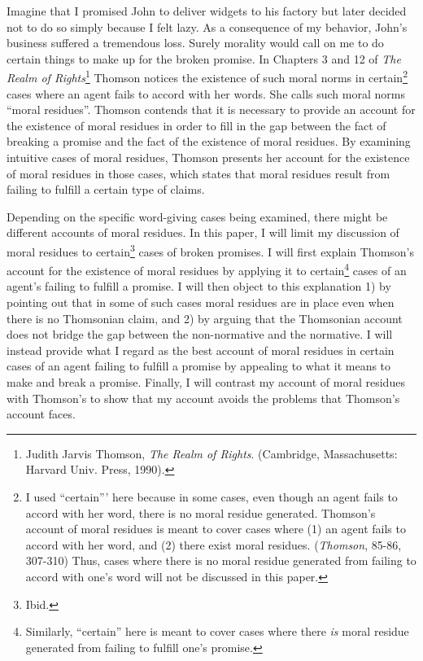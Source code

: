 Imagine that I promised John to deliver widgets to his factory but later
decided not to do so simply because I felt lazy. As a consequence of my
behavior, John's business suffered a tremendous loss. Surely morality
would call on me to do certain things to make up for the broken promise.
In Chapters 3 and 12 of \emph{The} \emph{Realm of Rights}\footnote{Judith
  Jarvis Thomson, \emph{The Realm of Rights}. (Cambridge, Massachusetts:
  Harvard Univ. Press, 1990).} Thomson notices the existence of such
moral norms in certain\footnote{I used ``certain''' here because in some
  cases, even though an agent fails to accord with her word, there is no
  moral residue generated. Thomson's account of moral residues is meant
  to cover cases where (1) an agent fails to accord with her word, and
  (2) there exist moral residues. (\emph{Thomson}, 85-86, 307-310) Thus,
  cases where there is no moral residue generated from failing to accord
  with one's word will not be discussed in this paper.} cases where an
agent fails to accord with her words. She calls such moral norms ``moral
residues''. Thomson contends that it is necessary to provide an account
for the existence of moral residues in order to fill in the gap between
the fact of breaking a promise and the fact of the existence of moral
residues. By examining intuitive cases of moral residues, Thomson
presents her account for the existence of moral residues in those cases,
which states that moral residues result from failing to fulfill a
certain type of claims.

Depending on the specific word-giving cases being examined, there might
be different accounts of moral residues. In this paper, I will limit my
discussion of moral residues to certain\footnote{Ibid.} cases of broken
promises. I will first explain Thomson's account for the existence of
moral residues by applying it to certain\footnote{Similarly, ``certain''
  here is meant to cover cases where there \emph{is} moral residue
  generated from failing to fulfill one's promise.} cases of an agent's
failing to fulfill a promise. I will then object to this explanation 1)
by pointing out that in some of such cases moral residues are in place
even when there is no Thomsonian claim, and 2) by arguing that the
Thomsonian account does not bridge the gap between the non-normative and
the normative. I will instead provide what I regard as the best account
of moral residues in certain cases of an agent failing to fulfill a
promise by appealing to what it means to make and break a promise.
Finally, I will contrast my account of moral residues with Thomson's to
show that my account avoids the problems that Thomson's account faces.

